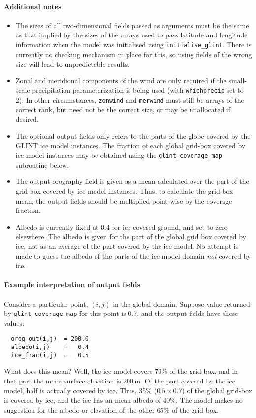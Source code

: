 \paragraph{Additional notes}
%
\begin{itemize}
\item The sizes of all two-dimensional fields passed as arguments must be the
  same as that implied by the sizes of the arrays used to pass latitude and
  longitude information when the model was initialised using
  \texttt{initialise\_glint}. There is
  currently no checking mechanism in place for this, so using fields of the wrong size
  will lead to unpredictable results.
\item Zonal and meridional components of the wind are only required if the
  small-scale precipitation parameterization is being used (with
  \texttt{whichprecip} set to 2). In other circumstances, \texttt{zonwind} and
  \texttt{merwind} must still be arrays of the correct rank, but need not be
  the correct size, or may be unallocated if desired.
\item The optional output fields only refers to the parts of the globe
  covered by the GLINT ice model instances. The fraction of each global
  grid-box covered by ice model instances may be obtained using the
  \texttt{glint\_coverage\_map} subroutine below. 
\item The output orography field is given as a mean calculated over the part
  of the grid-box covered by ice  model instances. Thus, to calculate the
  grid-box mean, the output fields should be multiplied point-wise by the
  coverage fraction. 
\item Albedo is currently fixed at 0.4 for ice-covered ground, and set to zero
  elsewhere. The albedo is given for the part of the global grid box covered
  by ice, not as an average of the part covered by the ice model. No attempt
  is made to guess the albedo of the parts of the ice model domain \emph{not}
  covered by ice.
\end{itemize}
%
\paragraph{Example interpretation of output fields}
%
Consider a particular point, $(i,j)$ in the global domain. Suppose value
returned by \texttt{glint\_coverage\_map} for this point is 0.7, and the
output fields have these values:
\begin{verbatim}
  orog_out(i,j)  = 200.0
  albedo(i,j)    =   0.4
  ice_frac(i,j)  =   0.5
\end{verbatim}
%
What does this mean? Well, the ice model covers 70\% of the grid-box, and in
that part the mean surface elevation is 200\,m. Of the part covered by the ice
model, half is actually covered by ice. Thus, 35\% ($0.5\times 0.7$) of the global grid-box is
covered by ice, and the ice has an mean albedo of 40\%. The model makes no suggestion for the
albedo or elevation of the other 65\% of the grid-box.
%
